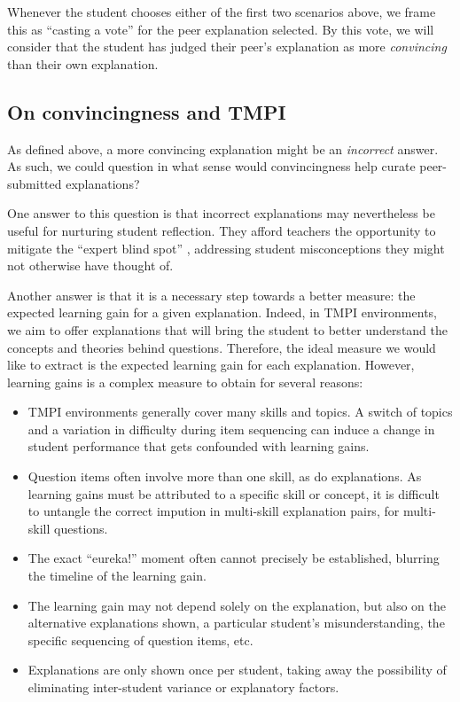 \documentclass[notitlepage,12pt]{jedm}
\begin{document}
Whenever the student chooses either of the first two scenarios above, we 
frame this as ``casting a vote'' for the peer explanation selected.
By this vote, we will consider that the student has judged their peer's explanation as more \textit{convincing} than their own explanation.

\subsection{On convincingness and TMPI}\label{sec:convincingness-tmpi}

As defined above, a more convincing explanation might be an \textit{incorrect} answer.  As such, we could question in what sense would convincingness help curate peer-submitted explanations?

One answer to this question is that incorrect explanations may nevertheless be useful for nurturing student reflection.   They afford teachers the opportunity to mitigate the ``expert blind spot'' 
\cite{nathan_expert_2001}, addressing student misconceptions they might not 
otherwise have thought of.

Another answer is that it is a necessary step towards a better measure: the expected learning gain for a given explanation.  Indeed, in TMPI environments, we aim to offer explanations that will bring the student to better understand the concepts and theories behind questions.  Therefore, the ideal measure we would like to extract is the expected learning gain for each explanation.  However, learning gains is a complex measure to obtain for several reasons:
        \begin{itemize}
        \item TMPI environments generally cover many skills and topics.  A switch of topics and a variation in difficulty during item sequencing can induce a change in student performance that gets confounded with learning gains.
        \item Question items often involve more than one skill, as do explanations.  As learning gains must be attributed to a specific skill or concept, it is difficult to untangle the correct impution in multi-skill explanation pairs, for multi-skill questions.
        \item The exact ``eureka!'' moment often cannot precisely be established, blurring the timeline of the learning gain.
        \item The learning gain may not depend solely on the explanation, but also on the alternative explanations shown, a particular student's misunderstanding, the specific sequencing of question items, etc.
        \item Explanations are only shown once per student, taking away the possibility of eliminating inter-student variance or explanatory factors.
        \end{itemize}
\end{document}
